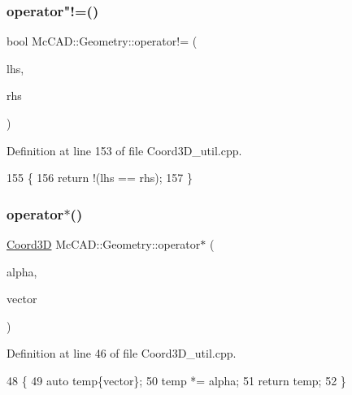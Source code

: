 \subsubsection{\texorpdfstring{operator"!=()}{operator!=()}\hspace{0.1cm}{\footnotesize\ttfamily [3/3]}}
{\footnotesize\ttfamily bool Mc\+C\+A\+D\+::\+Geometry\+::operator!= (\begin{DoxyParamCaption}\item[{const \hyperlink{classMcCAD_1_1Geometry_1_1Coord3D}{Coord3D} \&}]{lhs,  }\item[{const \hyperlink{classMcCAD_1_1Geometry_1_1Coord3D}{Coord3D} \&}]{rhs }\end{DoxyParamCaption})}



Definition at line 153 of file Coord3\+D\+\_\+util.\+cpp.


\begin{DoxyCode}
155                            \{
156     \textcolor{keywordflow}{return} !(lhs == rhs);
157 \}
\end{DoxyCode}
\mbox{\label{namespaceMcCAD_1_1Geometry_a87df988e228ea78505cdec0ef872094d}} 
\subsubsection{\texorpdfstring{operator$\ast$()}{operator*()}\hspace{0.1cm}{\footnotesize\ttfamily [1/9]}}
{\footnotesize\ttfamily \hyperlink{classMcCAD_1_1Geometry_1_1Coord3D}{Coord3D} Mc\+C\+A\+D\+::\+Geometry\+::operator$\ast$ (\begin{DoxyParamCaption}\item[{const \hyperlink{namespaceMcCAD_1_1Geometry_ac043b37a4a7e849fca22869e1982d2f8}{coord\+\_\+type} \&}]{alpha,  }\item[{const \hyperlink{classMcCAD_1_1Geometry_1_1Coord3D}{Coord3D} \&}]{vector }\end{DoxyParamCaption})}



Definition at line 46 of file Coord3\+D\+\_\+util.\+cpp.


\begin{DoxyCode}
48                               \{
49     \textcolor{keyword}{auto} temp\{vector\};
50     temp *= alpha;
51     \textcolor{keywordflow}{return} temp;
52 \}
\end{DoxyCode}
\mbox{\label{namespaceMcCAD_1_1Geometry_ab8737820743399743f2fb6adda1a8548}} 
